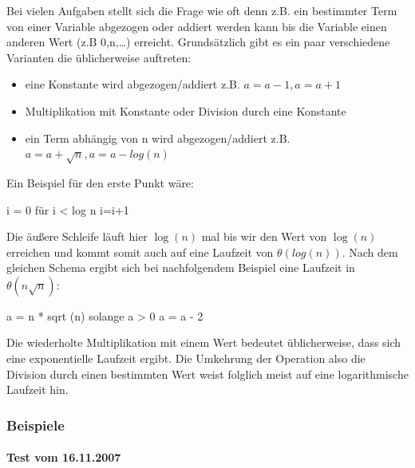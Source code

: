 \documentclass[a4paper, 12pt]{article}
\begin{document}
Bei vielen Aufgaben stellt sich die Frage wie oft denn z.B. ein bestimmter Term von einer Variable abgezogen oder addiert werden kann bis die Variable einen anderen Wert (z.B 0,n,\dots) erreicht. Grundsätzlich gibt es ein paar verschiedene Varianten die üblicherweise auftreten:

\begin{itemize}
	\item eine Konstante wird abgezogen/addiert z.B. $a=a-1, a=a+1$
	\item Multiplikation mit Konstante oder Division durch eine Konstante
	\item ein Term abhängig von n wird abgezogen/addiert z.B.\
	$a=a+\sqrt n, a=a-log\left(n\right)$
\end{itemize}

Ein Beispiel für den erste Punkt wäre:

\begin{verbatimtab}
i = 0
für i < log n {
	i=i+1
}
\end{verbatimtab}

Die äußere Schleife läuft hier $\log\left(n\right)$ mal bis wir den Wert von $\log\left(n\right)$ erreichen und kommt somit auch auf eine Laufzeit von $θ \left(log\left(n\right)\right)$. Nach dem gleichen Schema ergibt sich bei nachfolgendem Beispiel eine Laufzeit in $θ \left(n \sqrt n \right)$:

\begin{verbatimtab}
a = n * sqrt (n)
solange a > 0 {
	a = a - 2
}
\end{verbatimtab}

Die wiederholte Multiplikation mit einem Wert bedeutet üblicherweise, dass sich eine exponentielle Laufzeit ergibt. Die Umkehrung der Operation also die Division durch einen bestimmten Wert weist folglich meist auf eine logarithmische Laufzeit hin.

\subsubsection{Beispiele}

\paragraph{Test vom 16.11.2007}~\\
\label{section:Test_2007-11-16}
\end{document}
